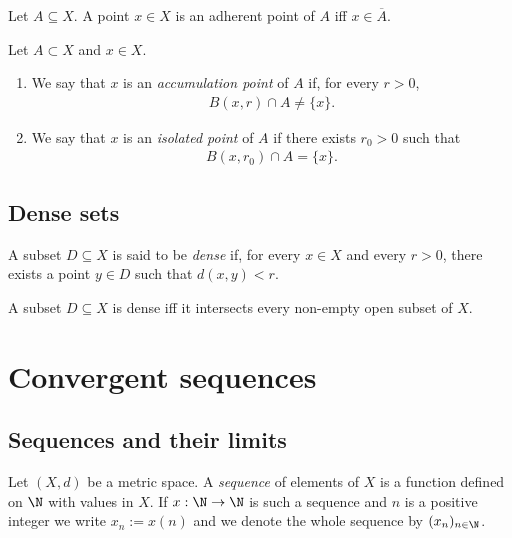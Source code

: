 \documentclass{article}
\begin{document}
\begin{proposition}[Notes 4.29]
    Let $A\subseteq X$. A point $x\in X$ is an adherent point of $A$ iff
    $x\in\overline A$.
\end{proposition}

\begin{definition}
    Let $A\subset X$ and $x\in X$.
    \begin{enumerate}
        \item We say that $x$ is an \emph{accumulation point} of $A$ if, for every $r>0$,
              \begin{align*}
                  B(x,r)\cap A\not=\{x\}.
              \end{align*}
        \item We say that $x$ is an \emph{isolated point} of $A$ if there exists $r_0>0$
              such that \begin{align*}
                  B(x,r_0)\cap A = \{x\}.
              \end{align*}
    \end{enumerate}
\end{definition}

\subsection{Dense sets}

\begin{definition}
    A subset $D\subseteq X$ is said to be \emph{dense} if, for every $x\in X$
    and every $r>0$, there exists a point $y\in D$ such that $d(x,y)<r$.
\end{definition}

\begin{proposition}[Notes 4.33]
    A subset $D\subseteq X$ is dense iff it intersects every non-empty open
    subset of $X$.
\end{proposition}

\section{Convergent sequences}

\subsection{Sequences and their limits}

\begin{definition}
    Let $(X,d)$ be a metric space. A \emph{sequence} of elements of $X$ is a function defined 
    on $\N$ with values in $X$. If $x:\N\to\N$ is such a sequence and $n$ is a positive integer
    we write $x_n:=x(n)$ and we denote the whole sequence by $(x_n)_{n\in\N}$.
\end{definition}
\end{document}
